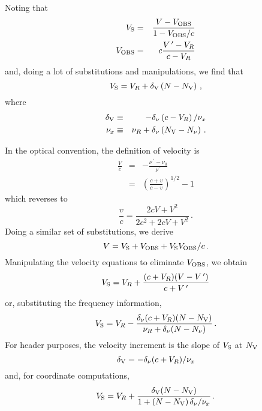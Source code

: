 Noting that
\begin{eqnarray*}
   V_{\hbox{\scriptsize S}}  & = & \frac{V - V_{\hbox{\scriptsize OBS}}}{1 - V_{\hbox{\scriptsize OBS}} / c} \\
   V_{\hbox{\scriptsize OBS}} & = & c \frac{V\,^{\prime} - V_R}{c - V_R}
\end{eqnarray*}
and, doing a lot of substitutions and manipulations, we find that
\begin{displaymath}
    V_{\hbox{\scriptsize S}} = V_R + \delta_{\hbox{\scriptsize V}} \left(N - N_{\hbox{\scriptsize V}}\right) \, ,
\end{displaymath}
where
\begin{eqnarray*}
   \delta_{\hbox{\scriptsize V}} &\equiv & -\delta_\nu \left( c-V_R \right) / \nu_x \\
   \nu_x     &\equiv &\nu_R + \delta_\nu \left( N_{\hbox{\scriptsize V}} - N_\nu \right)\,.
\end{eqnarray*}

In the optical convention, the definition of velocity is
\begin{eqnarray*}
  \frac{V}{c} & = & - \frac{\nu\,^{\prime} - \nu_0}{\nu\,^{\prime}} \\
              & = & \left( \frac{c + v}{c - v} \right)^{1/2} - 1
\end{eqnarray*}
which reverses to
\begin{displaymath}
    \frac{v}{c} = \frac{2cV + V^2}{2c^2 + 2cV + V^2} \, .
\end{displaymath}
Doing a similar set of substitutions, we derive
\begin{displaymath}
     V = V_{\hbox{\scriptsize S}} + V_{\hbox{\scriptsize OBS}} + V_{\hbox{\scriptsize S}}V_{\hbox{\scriptsize OBS}} / c \, .
\end{displaymath}
Manipulating the velocity equations to eliminate $V_{\hbox{\scriptsize OBS}}$, we obtain
\begin{displaymath}
    V_{\hbox{\scriptsize S}} = V_R + \frac{(c+V_R)(V-V\,^{\prime})}{c+V\,^{\prime}}
\end{displaymath}
or, substituting the frequency information,
\begin{displaymath}
    V_{\hbox{\scriptsize S}} = V_R - \frac{\delta_\nu (c+V_R)(N-N_{\hbox{\scriptsize V}})}{\nu_R +
           \delta_\nu (N-N_\nu)} \, .
\end{displaymath}
For header purposes, the velocity increment is the slope of $V_{\hbox{\scriptsize S}}$
at $N_{\hbox{\scriptsize V}}$
\begin{displaymath}
    \delta_{\hbox{\scriptsize V}} = -\delta_\nu (c+V_R) / \nu_x
\end{displaymath}
and, for coordinate computations,
\begin{displaymath}
    V_{\hbox{\scriptsize S}} = V_R+ \frac{\delta_{{\hbox{\scriptsize V}}}(N-N_{{\hbox{\scriptsize V}}})}{1+(N-N_{{\hbox{\scriptsize V}}})\,
         \delta_\nu/\nu_x} \, .
\end{displaymath}

